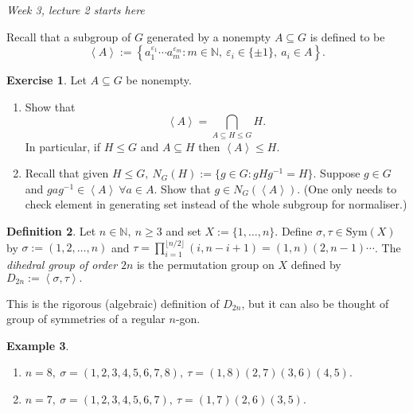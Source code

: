 \documentclass[a4paper]{article}
\newcommand{\la}{\left\langle}
\newcommand{\ra}{\right\rangle}
\newcommand{\N}{\mathbb{N}}
\newcommand{\Sym}{\text{Sym}}
\theoremstyle{definition}
\newtheorem{defn}{Definition}[subsection]
\newtheorem{example}[defn]{Example}
\newtheorem{exe}[defn]{Exercise}
\begin{document}
\begin{flushright}
\textit{Week 3, lecture 2 starts here}
\end{flushright}
Recall that a subgroup of $G$ generated by a nonempty $A\subseteq G$ is defined to be
\[
\la A\ra :=\left\{ a_1^{\varepsilon_1}\cdots a_m^{\varepsilon_m}:m\in\N,\ \varepsilon_i\in\{\pm 1\},\ a_i\in A \right\}.
\]
\begin{exe}
\label{exe:checkgeneratingset}
Let $A\subseteq G$ be nonempty.
\begin{enumerate}
\item Show that
\[
\la A\ra = \bigcap_{A\subseteq H\leq G} H.
\]
In particular, if $H\leq G$ and $A\subseteq H$ then $\la A\ra\leq H$.
\item Recall that given $H\leq G,\ N_G(H):=\{g\in G:gHg^{-1}=H\}$. Suppose $g\in G$ and $gag^{-1}\in\la A\ra \ \forall a\in A$. Show that $g\in N_G(\la A\ra).$ (One only needs to check element in generating set instead of the whole subgroup for normaliser.)
\end{enumerate}
\end{exe}
\begin{defn}
\label{defn:dihedralgp}
Let $n\in\N,\ n\geq 3$ and set $X:=\{1,\ldots,n\}$. Define $\sigma,\tau\in\Sym(X)$ by $\sigma:=(1,2,\ldots,n)$ and $\tau=\prod_{i=1}^{\lfloor n/2\rfloor} (i,n-i+1)=(1,n)(2,n-1)\cdots$. The \textit{dihedral group of order} $2n$ is the permutation group on $X$ defined by $D_{2n}:=\la\sigma,\tau\ra.$
\end{defn}
This is the rigorous (algebraic) definition of $D_{2n}$, but it can also be thought of group of symmetries of a regular $n$-gon.
\begin{example}
\begin{enumerate}
\item $n=8,\ \sigma=(1,2,3,4,5,6,7,8),\ \tau=(1,8)(2,7)(3,6)(4,5)$.
\item $n=7,\ \sigma=(1,2,3,4,5,6,7),\ \tau=(1,7)(2,6)(3,5)$.
\end{enumerate}
\end{example}
\end{document}
